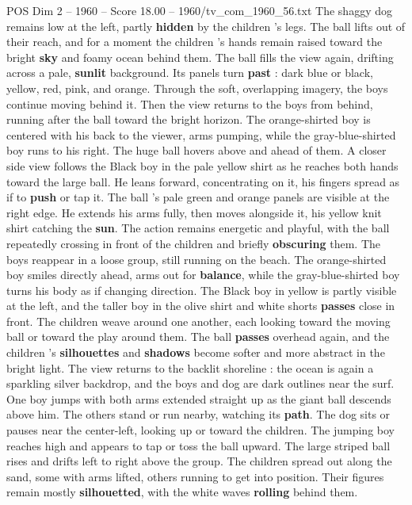 \begin{textsample}{POS Dim 2 – 1960 – Score 18.00 – 1960/tv\_com\_1960\_56.txt}
The shaggy dog remains low at the left, partly \textbf{hidden} by the children ’s legs.
The ball lifts out of their reach, and for a moment the children ’s hands remain raised toward the bright \textbf{sky} and foamy ocean behind them.
The ball fills the view again, drifting across a pale, \textbf{sunlit} background.
Its panels turn \textbf{past} : dark blue or black, yellow, red, pink, and orange.
Through the soft, overlapping imagery, the boys continue moving behind it.
Then the view returns to the boys from behind, running after the ball toward the bright horizon.
The orange-shirted boy is centered with his back to the viewer, arms pumping, while the gray-blue-shirted boy runs to his right.
The huge ball hovers above and ahead of them.
A closer side view follows the Black boy in the pale yellow shirt as he reaches both hands toward the large ball.
He leans forward, concentrating on it, his fingers spread as if to \textbf{push} or tap it.
The ball ’s pale green and orange panels are visible at the right edge.
He extends his arms fully, then moves alongside it, his yellow knit shirt catching the \textbf{sun}.
The action remains energetic and playful, with the ball repeatedly crossing in front of the children and briefly \textbf{obscuring} them.
The boys reappear in a loose group, still running on the beach.
The orange-shirted boy smiles directly ahead, arms out for \textbf{balance}, while the gray-blue-shirted boy turns his body as if changing direction.
The Black boy in yellow is partly visible at the left, and the taller boy in the olive shirt and white shorts \textbf{passes} close in front.
The children weave around one another, each looking toward the moving ball or toward the play around them.
The ball \textbf{passes} overhead again, and the children ’s \textbf{silhouettes} and \textbf{shadows} become softer and more abstract in the bright light.
The view returns to the backlit shoreline : the ocean is again a sparkling silver backdrop, and the boys and dog are dark outlines near the surf.
One boy jumps with both arms extended straight up as the giant ball descends above him.
The others stand or run nearby, watching its \textbf{path}.
The dog sits or pauses near the center-left, looking up or toward the children.
The jumping boy reaches high and appears to tap or toss the ball upward.
The large striped ball rises and drifts left to right above the group.
The children spread out along the sand, some with arms lifted, others running to get into position.
Their figures remain mostly \textbf{silhouetted}, with the white waves \textbf{rolling} behind them.

\end{textsample}
